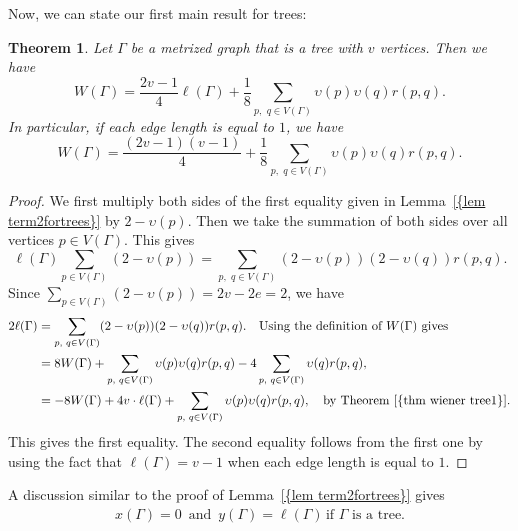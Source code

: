 \documentclass[12pt]{amsart}
\newtheorem{theorem}{Theorem}[section]
\theoremstyle{example}
\theoremstyle{definition}
\theoremstyle{notation}
\begin{document}
Now, we can state our first main result for trees:
\begin{theorem}\label{thm wiener tree2}
Let ${\Gamma}$ be a metrized graph that is a tree with $v$ vertices. Then we have
$$W({\Gamma})=\frac{2v-1}{4}{\ell ({\Gamma})}+ \frac{1}{8} \sum_{p, \, \, q \in {V({\Gamma})}} {\upsilon}(p) {\upsilon}(q) r(p,q).$$
In particular, if each edge length is equal to $1$, we have
$$W({\Gamma})=\frac{(2v-1)(v-1)}{4}+ \frac{1}{8} \sum_{p, \, \, q \in {V({\Gamma})}} {\upsilon}(p) {\upsilon}(q) r(p,q).$$
\end{theorem}
\begin{proof}
We first multiply both sides of the first equality given in {Lemma~\ref{{lem term2fortrees}}} by $2-{\upsilon}(p)$. Then
we take the summation of both sides over all vertices $p \in {V({\Gamma})}$. This gives
$${\ell ({\Gamma})} \sum_{p \in {V({\Gamma})}} (2- {\upsilon}(p) ) = \sum_{p, \, \, q \in {V({\Gamma})}} (2-{\upsilon}(p)) (2-{\upsilon}(q)) r(p,q).$$
Since $\sum_{p \in {V({\Gamma})}} (2- {\upsilon}(p) )=2v-2e=2$, we have
\begin{equation*}\label{eqn wiener2}
\begin{split}
2 {\ell ({\Gamma})} &= \sum_{p, \, \, q \in {V({\Gamma})}} (2-{\upsilon}(p)) (2-{\upsilon}(q)) r(p,q). \quad \text{Using the definition of $W({\Gamma})$ gives} \\
&= 8W({\Gamma})+\sum_{p, \, \, q \in {V({\Gamma})}} {\upsilon}(p) {\upsilon}(q) r(p,q)-4\sum_{p, \, \, q \in {V({\Gamma})}} {\upsilon}(q) r(p,q), \\
&=-8W({\Gamma})+4v\cdot {\ell ({\Gamma})}+\sum_{p, \, \, q \in {V({\Gamma})}} {\upsilon}(p) {\upsilon}(q) r(p,q), \quad \text{by  {Theorem~\ref{{thm wiener tree1}}}.}
\end{split}
\end{equation*}
This gives the first equality. The second equality follows from the first one by using the fact that ${\ell ({\Gamma})}=v-1$ when each edge length is equal to $1$.
\end{proof}
A discussion similar to the proof of {Lemma~\ref{{lem term2fortrees}}} gives
\begin{equation}\label{eqn x and y for tree}
\begin{split}
x({\Gamma})=0  \, \text{   and   }  \, y({\Gamma})={\ell ({\Gamma})}  \, \text{if ${\Gamma}$ is a tree.}
\end{split}
\end{equation}
\end{document}
